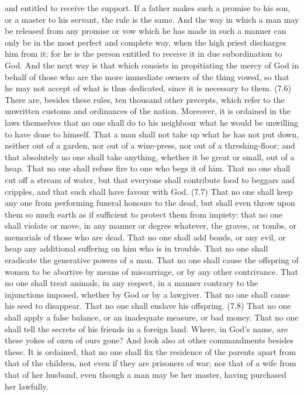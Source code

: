 and entitled to receive the support. If a father makes such a promise to his son, or a master to his
servant, the rule is the same. And the way in which a man may be released from any promise or vow
which he has made in such a manner can only be in the most perfect and complete way, when the high
priest discharges him from it; for he is the person entitled to receive it in due subordination to God. And
the next way is that which consists in propitiating the mercy of God in behalf of those who are the more
immediate owners of the thing vowed, so that he may not accept of what is thus dedicated, since it is
necessary to them. (7.6) There are, besides these rules, ten thousand other precepts, which refer to the
unwritten customs and ordinances of the nation. Moreover, it is ordained in the laws themselves that no
one shall do to his neighbour what he would be unwilling to have done to himself. That a man shall not
take up what he has not put down, neither out of a garden, nor out of a wine-press, nor out of a
threshing-floor; and that absolutely no one shall take anything, whether it be great or small, out of a
heap. That no one shall refuse fire to one who begs it of him. That no one shall cut off a stream of
water, but that everyone shall contribute food to beggars and cripples, and that such shall have favour
with God. (7.7) That no one shall keep any one from performing funeral honours to the dead, but shall
even throw upon them so much earth as if sufficient to protect them from impiety: that no one shall
violate or move, in any manner or degree whatever, the graves, or tombs, or memorials of those who are
dead. That no one shall add bonds, or any evil, or heap any additional suffering on him who is in
trouble. That no one shall eradicate the generative powers of a man. That no one shall cause the
offspring of women to be abortive by means of miscarriage, or by any other contrivance. That no one
shall treat animals, in any respect, in a manner contrary to the injunctions imposed, whether by God or
by a lawgiver. That no one shall cause his seed to disappear. That no one shall enslave his offspring.
(7.8) That no one shall apply a false balance, or an inadequate measure, or bad money. That no one
shall tell the secrets of his friends in a foreign land. Where, in God's name, are these yokes of oxen of
ours gone? And look also at other commandments besides these. It is ordained, that no one shall fix the
residence of the parents apart from that of the children, not even if they are prisoners of war; nor that of
a wife from that of her husband, even though a man may be her master, having purchased her lawfully.
